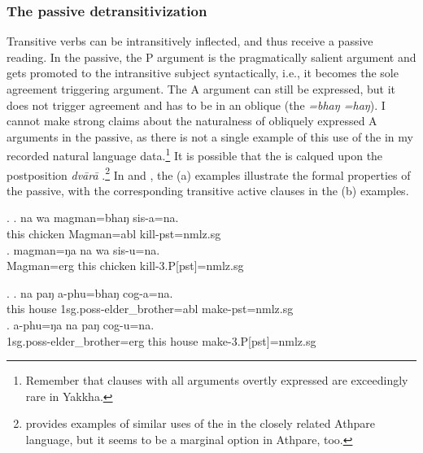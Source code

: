 
\subsubsection{The passive detransitivization}\label{detr-pass}

Transitive verbs can be intransitively inflected, and thus receive a passive reading. In the passive, the P argument is the pragmatically salient argument and gets promoted to the intransitive subject syntactically, i.e., it becomes the sole agreement triggering argument. The  A argument can still be expressed, but it does not trigger agreement and has to be in an oblique  (the  \emph{=bhaŋ \ti =haŋ}). I cannot make strong claims about the naturalness of obliquely expressed A arguments in the passive, as there is not a single example of this use of the  in my recorded natural language data.\footnote{Remember that clauses with all arguments overtly expressed are exceedingly rare in Yakkha.}  It is possible that the  is calqued upon the  postposition \emph{dvārā} .\footnote{\citet[123]{Ebert1997A-grammar} provides examples of similar uses of the  in the closely related Athpare language, but it seems to be a marginal option in Athpare, too.}  In  \Next and \NNext, the (a) examples illustrate the formal properties of the passive, with the corresponding transitive active clauses in the (b) examples.

\ex. \ag. na wa magman=bhaŋ sis-a=na.\\
			this chicken  Magman{\sc =abl} kill{\sc [3sg]-pst=nmlz.sg}\\
	\bg. magman=ŋa na wa sis-u=na.\\
		Magman{\sc =erg}	this chicken  kill{\sc -3.P[pst]=nmlz.sg}\\
		
	\ex. \ag.  na paŋ a-phu=bhaŋ cog-a=na.\\
	this house  {\sc 1sg.poss-}elder\_brother{\sc =abl} make{\sc [3sg]-pst=nmlz.sg}\\
	\bg. a-phu=ŋa na paŋ cog-u=na.\\
	 {\sc 1sg.poss-}elder\_brother{\sc =erg} this house make{\sc -3.P[pst]=nmlz.sg}\\

